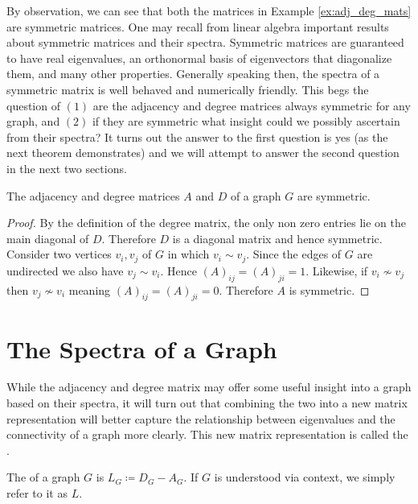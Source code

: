 \documentclass[11pt]{article}
\begin{document}
By observation, we can see that both the matrices in Example \ref{ex:adj_deg_mats} are symmetric matrices. One may recall from linear algebra important results about symmetric matrices and their spectra. Symmetric matrices are guaranteed to have real eigenvalues, an orthonormal basis of eigenvectors that diagonalize them, and many other properties. Generally speaking then, the spectra of a symmetric matrix is well behaved and numerically friendly. This begs the question of $(1)$ are the adjacency and degree matrices always symmetric for any graph, and $(2)$ if they are symmetric what insight could we possibly ascertain from their spectra? It turns out the answer to the first question is yes (as the next theorem demonstrates) and we will attempt to answer the second question in the next two sections.

\begin{theorem}
    \label{thm:adj_deg_symmetric}
    The adjacency and degree matrices $A$ and $D$ of a graph $G$ are symmetric.
\end{theorem}

\begin{proof}
    By the definition of the degree matrix, the only non zero entries lie on the main diagonal of $D$. Therefore $D$ is a diagonal matrix and hence symmetric. Consider two vertices $v_i, v_j$ of $G$ in which $v_i \sim v_j$. Since the edges of $G$ are undirected we also have $v_j \sim v_i$. Hence $(A)_{ij} = (A)_{ji} = 1$. Likewise, if $v_i \not\sim v_j$ then $v_j \not\sim v_i$ meaning $(A)_{ij} = (A)_{ji} = 0$. Therefore $A$ is symmetric.
\end{proof}

\section{The Spectra of a Graph}


While the adjacency and degree matrix may offer some useful insight into a graph based on their spectra, it will turn out that combining the two into a new matrix representation will better capture the relationship between eigenvalues and the connectivity of a graph more clearly. This new matrix representation is called the .

\begin{definition}
    The  of a graph $G$ is $L_G \coloneq D_G - A_G$. If $G$ is understood via context, we simply refer to it as $L$.
\end{definition}
\end{document}
